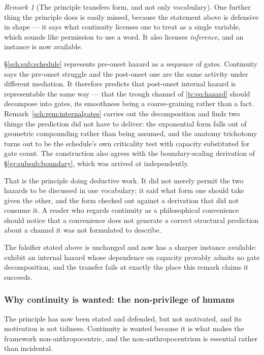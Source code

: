 \documentclass[11pt]{article}
\numberwithin{equation}{section}
\theoremstyle{plain}
\theoremstyle{definition}
\theoremstyle{remark}
\newtheorem{remark}[theorem]{Remark}
\begin{document}
\begin{remark}[The principle transfers form, and not only vocabulary]
\label{gc:rem:continuitydeductive}
One further thing the principle does is easily missed, because the
statement above is defensive in shape --- it says what continuity
licenses one to treat as a single variable, which sounds like permission
to use a word. It also licenses \emph{inference}, and an instance is now
available.

\S\ref{sch:sub:schedule} represents pre-onset hazard as a sequence of
gates. Continuity says the pre-onset struggle and the post-onset one are
the same activity under different mediation. It therefore predicts that
post-onset internal hazard is representable the same way --- that the
trough channel of \eqref{tc:eq:hazard} should decompose into gates, its
smoothness being a coarse-graining rather than a fact.
Remark~\ref{sch:rem:internalgates} carries out the decomposition and
finds two things the prediction did not have to deliver: the exponential
form falls out of geometric compounding rather than being assumed, and
the anatomy trichotomy turns out to be the schedule's own criticality
test with capacity substituted for gate count. The construction also
agrees with the boundary-scaling derivation of
\S\ref{gr:subsub:boundary}, which was arrived at independently.

That is the principle doing deductive work. It did not merely permit the
two hazards to be discussed in one vocabulary; it said what form one
should take given the other, and the form checked out against a
derivation that did not consume it. A reader who regards continuity as a
philosophical convenience should notice that a convenience does not
generate a correct structural prediction about a channel it was not
formulated to describe.

The falsifier stated above is unchanged and now has a sharper instance
available: exhibit an internal hazard whose dependence on capacity
provably admits no gate decomposition, and the transfer fails at exactly
the place this remark claims it succeeds.
\end{remark}

\subsubsection{Why continuity is wanted: the non-privilege of humans}
\label{gc:subsub:nonprivilege}

The principle has now been stated and defended, but not motivated, and
its motivation is not tidiness. Continuity is wanted because it is what
makes the framework non-anthropocentric, and the non-anthropocentrism is essential rather than incidental.
\end{document}
